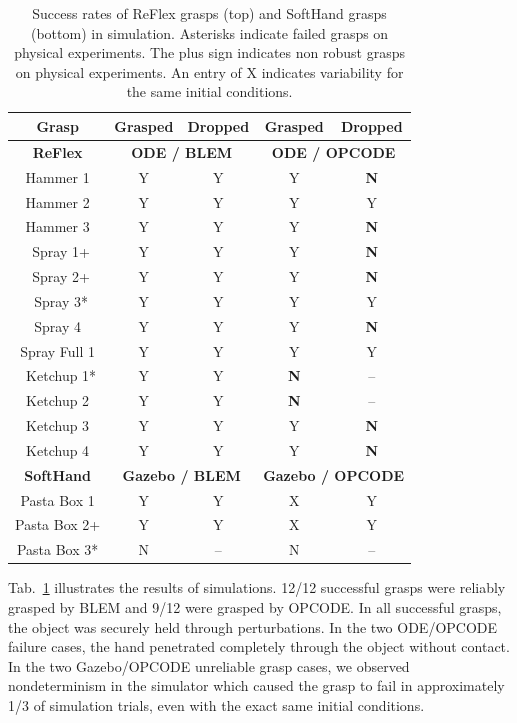 \begin{table}[hbt]
   \begin{center}
   \begin{tabular}{| c | c  c | c c |}
   \hline
   Grasp & Grasped & Dropped & Grasped & Dropped\\
   \hline
    {\bf ReFlex} & \multicolumn{2}{c|}{{\bf ODE / BLEM}} & \multicolumn{2}{c|}{{\bf ODE / OPCODE}} \\
   \cline{1-5}
   Hammer 1	    & Y & Y & Y & {\bf N} \\
   Hammer 2	    & Y & Y & Y & Y \\
   Hammer 3	    & Y & Y & Y & {\bf N} \\
   ~Spray 1+	& Y & Y & Y & {\bf N} \\
   ~Spray 2+	& Y & Y & Y & {\bf N} \\
   ~Spray 3*	& Y & Y & Y & Y \\
   Spray 4	& Y & Y & Y & {\bf N} \\
   Spray Full 1	& Y & Y & Y & Y \\
   ~Ketchup 1*	& Y & Y & {\bf N} & -- \\
   Ketchup 2	& Y & Y & {\bf N} & -- \\
   Ketchup 3	& Y & Y & Y & {\bf N} \\
   Ketchup 4	& Y & Y & Y & {\bf N} \\
   \hline
   {\bf SoftHand} & \multicolumn{2}{c|}{{\bf Gazebo / BLEM}} & \multicolumn{2}{c|}{{\bf Gazebo / OPCODE}} \\
   \hline
   Pasta Box 1  & Y & Y & X & Y \\
   Pasta Box 2+ & Y & Y & X & Y \\
   Pasta Box 3* & N & -- & N  & -- \\
   \hline
   \end{tabular}
   \end{center}
   \caption{Success rates of ReFlex grasps (top) and SoftHand grasps (bottom) in simulation.  Asterisks indicate failed grasps on physical experiments. The plus sign indicates non robust grasps on physical experiments.  An entry of X  indicates variability for the same initial conditions.}
   \label{table:GraspSuccess}
\end{table}

Tab.~\ref{table:GraspSuccess} illustrates the results of simulations. 12/12 successful grasps were reliably grasped by BLEM and 9/12 were grasped by OPCODE. In all successful grasps, the object was securely held through perturbations.  In the two ODE/OPCODE failure cases, the hand  penetrated completely through the object without contact.  In the two Gazebo/OPCODE unreliable grasp cases, we observed  nondeterminism in the simulator which caused the grasp to fail in approximately 1/3 of simulation trials, even with the exact same initial conditions.

